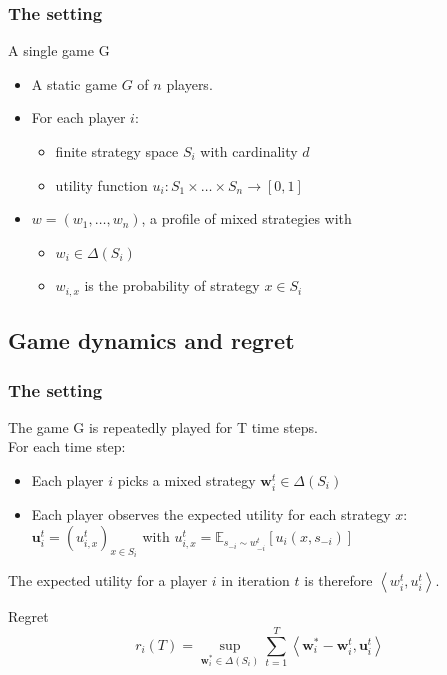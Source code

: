 \documentclass{beamer}
\begin{document}
\begin{frame}
	\frametitle{The setting}
	\begin{block}{A single game G}
	\begin{itemize}
		\item A static game $G$ of $n$ players.
		\item For each player $i$:
		\begin{itemize}
			\item finite strategy space $S_i$ with cardinality $d$
			\item utility function $u_i : S_1 \times \ldots \times S_n \rightarrow [0,1]$
		\end{itemize} \pause
		\item $ w = (w_1 , \ldots, w_n)$, a profile of mixed strategies with
		\begin{itemize}
			\item $w_i \in \Delta(S_i)$
			\item $w_{i,x}$ is the probability of strategy $x \in S_i$
		\end{itemize}
	\end{itemize}
	\end{block}
\end{frame}

\subsection{Game dynamics and regret}
\begin{frame}
	\frametitle{The setting}
	The game G is repeatedly played for T time steps.\\
	For each time step:
	\begin{itemize}
		\item Each player $i$ picks a mixed strategy $\mathbf{w}^t_i \in \Delta(S_i)$ 
		\item Each player observes the expected utility for each strategy $x$: $\mathbf{u}^t_i = (u^t_{i,x})_{x \in S_i} $ with $ u^t_{i,x} = \mathbb{E}_{s_{-i} \sim w^t_{-i}} \left[u_i(x,s_{-i})\right] $
	\end{itemize}
	
	The expected utility for a player $i$ in iteration $t$ is therefore 
	$ \left\langle w^t_{i},u^t_{i}\right\rangle $.
	\pause
	\begin{block}{Regret}
		\begin{equation*}
			r_i(T) = \sup\limits_{\mathbf{w}^*_i \in \Delta (S_i)} \sum_{t=1}^{T} \left< \mathbf{w}^*_i - \mathbf{w}^t_i, \mathbf{u}^t_i \right>
		\end{equation*}
	
	\end{block}
	
\end{frame}
\end{document}
